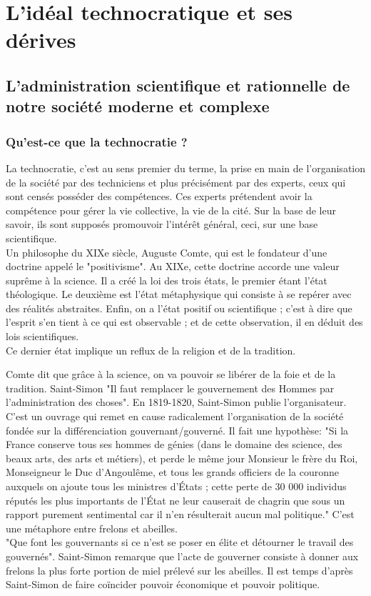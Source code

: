 \documentclass[10pt, a4paper, openany]{book}
\begin{document}
\section{L'idéal technocratique et ses dérives}

\subsection{L'administration scientifique et rationnelle de notre société moderne et complexe}

\subsubsection{Qu'est-ce que la technocratie ?}

La technocratie, c'est au sens premier du terme, la prise en main de l'organisation de la société par des techniciens et plus précisément par des experts, ceux qui sont censés posséder des compétences. Ces experts prétendent avoir la compétence pour gérer la vie collective, la vie de la cité. Sur la base de leur savoir, ils sont supposés promouvoir l'intérêt général, ceci, sur une base scientifique. \\
Un philosophe du XIXe siècle, Auguste Comte, qui est le fondateur d'une doctrine appelé le "positivisme". Au XIXe, cette doctrine accorde une valeur suprême à la science. Il a créé la loi des trois états, le premier étant l'état théologique. Le deuxième est l'état métaphysique qui consiste à se repérer avec des réalités abstraites. Enfin, on a l'état positif ou scientifique ; c'est à dire que l'esprit s'en tient à ce qui est observable ; et de cette observation, il en déduit des lois scientifiques. \\
Ce dernier état implique un reflux de la religion et de la tradition.


Comte dit que grâce à la science, on va pouvoir se libérer de la foie et de la tradition. Saint-Simon "Il faut remplacer le gouvernement des Hommes par l'administration des choses". En 1819-1820, Saint-Simon publie l'organisateur. C'est un ouvrage qui remet en cause radicalement l'organisation de la société fondée sur la différenciation gouvernant/gouverné. Il fait une hypothèse: "Si la France conserve tous ses hommes de génies (dans le domaine des science, des beaux arts, des arts et métiers), et perde le même jour Monsieur le frère du Roi, Monseigneur le Duc d'Angoulême, et tous les grands officiers de la couronne auxquels on ajoute tous les ministres d'États ; cette perte de 30 000 individus réputés les plus importants de l'État ne leur causerait de chagrin que sous un rapport purement sentimental car il n'en résulterait aucun mal politique." C'est une métaphore entre frelons et abeilles. \\
"Que font les gouvernants si ce n'est se poser en élite et détourner le travail des gouvernés". Saint-Simon remarque que l'acte de gouverner consiste à donner aux frelons la plus forte portion de miel prélevé sur les abeilles. Il est temps d'après Saint-Simon de faire coïncider pouvoir économique et pouvoir politique. 
\end{document}

